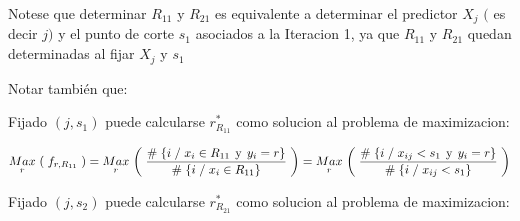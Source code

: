 \documentclass[
  11pt,
  a4paper,
]{article}
\begin{document}
\vspace{0.5cm}

Notese que determinar \(R_{11}\) y \(R_{21}\) es equivalente a
determinar el predictor \(X_j\) \((\) es decir \(j)\) y el punto de
corte \(s_1\) asociados a la Iteracion 1, ya que \(R_{11}\) y \(R_{21}\)
quedan determinadas al fijar \(X_j\) y \(s_1\)

\newpage

Notar también que:

\vspace{0.5cm}

Fijado \((j, s_1)\) puede calcularse \(r_{R_{11}}^*\) como solucion al
problema de maximizacion:

\[\underset{  r}{ Max} \hspace{0.05 cm} \left(\hspace{0.1 cm} f_{r, R_{11}} \hspace{0.1 cm}\right) = \underset{ r}{ Max} \hspace{0.05 cm} \left(\hspace{0.1 cm}   \dfrac{\# \hspace{0.1 cm}\lbrace i \hspace{0.1 cm}/\hspace{0.1 cm} x_i \in R_{11} \hspace{0.15 cm}\text{y}\hspace{0.15 cm} y_i = r \rbrace}{\# \hspace{0.1 cm}\lbrace i \hspace{0.1 cm}/\hspace{0.1 cm} x_i \in R_{11}  \rbrace}  \hspace{0.1 cm}\right) = \underset{  r}{ Max} \hspace{0.05 cm} \left(\hspace{0.1 cm}   \dfrac{\# \hspace{0.1 cm}\lbrace i \hspace{0.1 cm}/\hspace{0.1 cm} x_{ij} < s_1 \hspace{0.15 cm}\text{y}\hspace{0.15 cm} y_i = r \rbrace}{\# \hspace{0.1 cm}\lbrace i \hspace{0.1 cm}/\hspace{0.1 cm} x_{ij} < s_1 \rbrace}  \hspace{0.1 cm}\right)\]

Fijado \((j, s_2)\) puede calcularse \(r_{R_{21}}^*\) como solucion al
problema de maximizacion:
\end{document}
